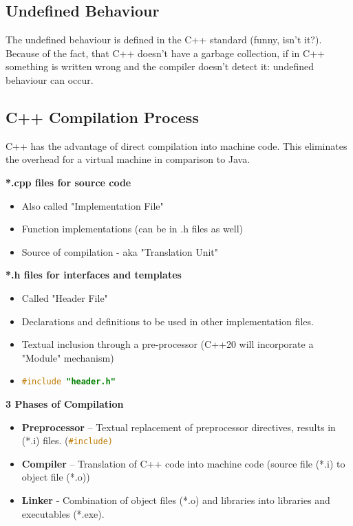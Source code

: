 \subsection{Undefined Behaviour}
The undefined behaviour is defined in the C++ standard (funny, isn't it?). Because of the fact, that C++ doesn't have a garbage collection, if in C++ something is written wrong and the compiler doesn't detect it: undefined behaviour can occur.

\subsection{C++ Compilation Process}
C++ has the advantage of direct compilation into machine code. This eliminates the overhead for a virtual machine in comparison to Java.

\textbf{*.cpp files for source code}
\begin{itemize}
  \itemsep -0.5em 
  \item Also called "Implementation File"
  \item Function implementations (can be in .h files as well)
  \item Source of compilation - aka "Translation Unit"
\end{itemize}
\textbf{*.h files for interfaces and templates}
\begin{itemize}
  \itemsep -0.5em 
  \item Called "Header File"
  \item Declarations and definitions to be used in other implementation files.
  \item Textual inclusion through a pre-processor (C++20 will incorporate a "Module" mechanism)
  \item \lstinline[language=C++]{#include "header.h"}
\end{itemize}

\textbf{3 Phases of Compilation}
\begin{itemize}
  \itemsep -0.5em 
  \item \textbf{Preprocessor} – Textual replacement of preprocessor directives, results in (*.i) files. (\lstinline[language=C++]{#include)}
  \item \textbf{Compiler} – Translation of C++ code into machine code (source file (*.i) to object file (*.o))
  \item \textbf{Linker} - Combination of object files (*.o) and libraries into libraries and executables (*.exe).
\end{itemize}

